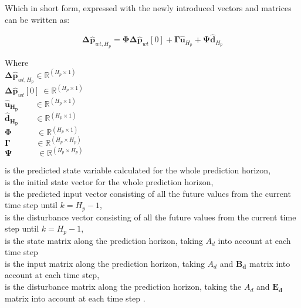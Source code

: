 Which in short form, expressed with the newly introduced vectors and matrices can be written as: 

\begin{equation}
	\bm{\Delta \hat{p}}_{wt,H_p} = \bm{\Phi} \bm{\Delta \hat{p}}_{wt}[0] + \bm{\Gamma} \bm{\hat{u}}_{H_p} + \bm{\Psi} \bm{\hat{d}}_{H_p}
	\label{extendedmatrix}
\end{equation}

\begin{minipage}[t]{0.3\textwidth}
Where\\
\hspace*{8mm} $\bm{\Delta \hat{p}}_{wt,H_p} \in \pmb{\mathbb{R}}^{(H_p \times 1)}$ \\
\newline
\hspace*{8mm} $\bm{\Delta \hat{p}}_{wt}[0] \:\in \pmb{\mathbb{R}}^{(H_p \times 1)}$ \\
\hspace*{8mm} $\bm{\hat{u}_{H_p}} \:\:\:\:\:\:\:\:\, \in \pmb{\mathbb{R}}^{(H_p \times 1)}$ \\
\newline
\hspace*{8mm} $\bm{\hat{d}_{H_p}} \:\:\:\:\:\:\:\:\: \in \pmb{\mathbb{R}}^{(H_p \times 1)}$ \\
\newline
\hspace*{8mm} $\bm{\Phi} \:\:\:\:\:\:\:\:\:\:\:\:\:\, \in \pmb{\mathbb{R}}^{(H_p \times 1)}$ \\
\newline
\hspace*{8mm} $\bm{\Gamma} \:\:\:\:\:\:\:\:\:\:\:\:\:\, \in \pmb{\mathbb{R}}^{(H_p \times H_p)}$ \\
\newline
\hspace*{8mm} $\bm{\Psi} \:\:\:\:\:\:\:\:\:\:\:\:\:\, \in \pmb{\mathbb{R}}^{(H_p \times H_p)}$ 
\end{minipage}
\begin{minipage}[t]{0.64\textwidth}
\vspace*{2mm}
is the predicted state variable calculated for the whole prediction horizon, \\
is the initial state vector for the whole prediction horizon, \\
is the predicted input vector consisting of all the future values from the current time step until $k = H_p-1$, \\
is the disturbance vector consisting of all the future values from the current time step until $k = H_p-1$, \\
is the state matrix along the prediction horizon, taking $A_d$ into account at each time step \\
is the input matrix along the prediction horizon, taking $A_d$ and $\bm{B_d}$ matrix into account at each time step, \\
is the disturbance matrix along the prediction horizon, taking the $A_d$ and $\bm{E_d}$ matrix into account at each time step . \\ 
\end{minipage}

